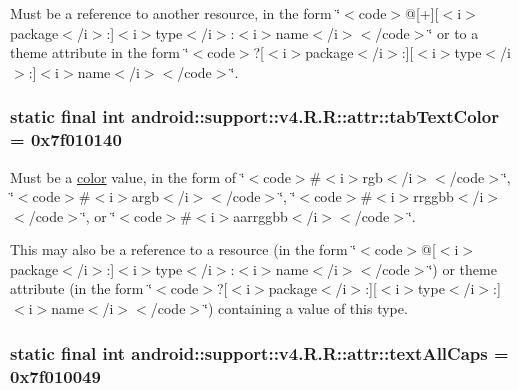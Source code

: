 Must be a reference to another resource, in the form \char`\"{}$<$code$>$@\mbox{[}+\mbox{]}\mbox{[}$<$i$>$package$<$/i$>$:\mbox{]}$<$i$>$type$<$/i$>$:$<$i$>$name$<$/i$>$$<$/code$>$\char`\"{} or to a theme attribute in the form \char`\"{}$<$code$>$?\mbox{[}$<$i$>$package$<$/i$>$:\mbox{]}\mbox{[}$<$i$>$type$<$/i$>$:\mbox{]}$<$i$>$name$<$/i$>$$<$/code$>$\char`\"{}. \hypertarget{classandroid_1_1support_1_1v4_1_1_r_1_1attr_0d1040f3c94d4aee900ca93b633da9d7}{
\subsubsection[{tabTextColor}]{\setlength{\rightskip}{0pt plus 5cm}static final int android::support::v4.R.R::attr::tabTextColor = 0x7f010140}}
\label{classandroid_1_1support_1_1v4_1_1_r_1_1attr_0d1040f3c94d4aee900ca93b633da9d7}


Must be a \hyperlink{classandroid_1_1support_1_1v4_1_1_r_1_1color}{color} value, in the form of \char`\"{}$<$code$>$\#$<$i$>$rgb$<$/i$>$$<$/code$>$\char`\"{}, \char`\"{}$<$code$>$\#$<$i$>$argb$<$/i$>$$<$/code$>$\char`\"{}, \char`\"{}$<$code$>$\#$<$i$>$rrggbb$<$/i$>$$<$/code$>$\char`\"{}, or \char`\"{}$<$code$>$\#$<$i$>$aarrggbb$<$/i$>$$<$/code$>$\char`\"{}. 

This may also be a reference to a resource (in the form \char`\"{}$<$code$>$@\mbox{[}$<$i$>$package$<$/i$>$:\mbox{]}$<$i$>$type$<$/i$>$:$<$i$>$name$<$/i$>$$<$/code$>$\char`\"{}) or theme attribute (in the form \char`\"{}$<$code$>$?\mbox{[}$<$i$>$package$<$/i$>$:\mbox{]}\mbox{[}$<$i$>$type$<$/i$>$:\mbox{]}$<$i$>$name$<$/i$>$$<$/code$>$\char`\"{}) containing a value of this type. \hypertarget{classandroid_1_1support_1_1v4_1_1_r_1_1attr_ac76588229a187640be143ffaac296c9}{
\subsubsection[{textAllCaps}]{\setlength{\rightskip}{0pt plus 5cm}static final int android::support::v4.R.R::attr::textAllCaps = 0x7f010049}}
\label{classandroid_1_1support_1_1v4_1_1_r_1_1attr_ac76588229a187640be143ffaac296c9}


